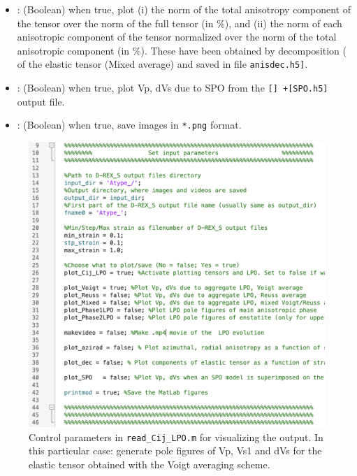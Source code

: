 \begin{itemize}
    \item {}: (Boolean) when true, plot (i) the norm of the total anisotropy component of the tensor over the norm of the full tensor (in \%), and (ii) the norm of each anisotropic component of the tensor normalized over the norm of the total anisotropic component (in \%). These have been obtained by decomposition (\citet{browaeys2004gji} of the elastic tensor (Mixed average) and saved in file \texttt{anisdec.h5]}.
    
    \item {}: (Boolean) when true, plot Vp, dVs due to SPO from the \texttt{[] +[SPO.h5]} output file.  
        
    \item {}: (Boolean) when true, save images in \texttt{*.png} format.
\end{itemize}
\vspace{1.0cm}

\begin{figure}[ht]
    \centering
    \includegraphics[width=1.0\textwidth]{DREX_S/drexs_viz.png}
    \caption{Control parameters in \texttt{read\_Cij\_LPO.m} for visualizing the \drexstitle{} output. In this particular case: generate pole figures of Vp, Vs1 and dVs for the elastic tensor obtained with the Voigt averaging scheme.}
    \label{fig:drexs_viz}
\end{figure}

